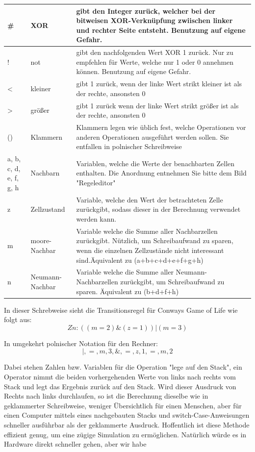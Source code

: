 \documentclass[11pt,a4paper]{article}
\begin{document}
\begin{longtable}[m]{|m{2cm}|m{2.5cm}|m{6.5cm}|}
\hline
\#&XOR&gibt den Integer zurück, welcher bei der bitweisen XOR-Verknüpfung zwiischen linker und rechter Seite entsteht. Benutzung auf eigene Gefahr.\\
\hline
! & not & gibt den nachfolgenden Wert XOR 1 zurück. Nur zu empfehlen für Werte, welche nur 1 oder 0 annehmen können. Benutzung auf eigene Gefahr.\\
\hline
< & kleiner & gibt 1 zurück, wenn der linke Wert strikt kleiner ist als der rechte, ansonsten 0\\
\hline
>&größer & gibt 1 zurück wenn der linke Wert strikt größer ist als der rechte, ansonsten 0\\
\hline
()&Klammern&Klammern legen wie üblich fest, welche Operationen vor anderen Operationen ausgeführt werden sollen. Sie entfallen in polnischer Schreibweise\\
\hline
a, b, c, d, e, f, g, h&Nachbarn&Variablen, welche die Werte der benachbarten Zellen enthalten. Die Anordnung entnehmen Sie bitte dem Bild "Regeleditor"\\
\hline 
z&Zellzustand& Variable, welche den Wert der betrachteten Zelle zurückgibt, sodass dieser in der Berechnung verwendet werden kann.\\
\hline
m&moore-Nachbar&Variable welche die Summe aller Nachbarzellen zurückgibt. Nützlich, um Schreibaufwand zu sparen, wenn die einzelnen Zellzustände nicht interessant sind.Äquivalent zu (a+b+c+d+e+f+g+h)\\
\hline
n&Neumann-Nachbar&Variable welche die Summe aller Neumann-Nachbarzellen zurückgibt, um Schreibaufwand zu sparen.  Äquivalent zu (b+d+f+h)\\
\hline
\end{longtable}
\par
In dieser Schrebweise sieht die Transitionsregel für Conways Game of Life wie folgt aus:
\[Zn : ((m=2)\&(z=1))|(m=3) \]
\par
In umgekehrt polnischer Notation für den Rechner:
\[|,=,m,3,\&,=,z,1,=,m,2\]
\par
Dabei stehen Zahlen bzw. Variablen für die Operation "lege auf den Stack", ein Operator nimmt die beiden vorhergehenden Werte von links nach rechts vom Stack und legt das Ergebnis zurück auf den Stack.
Wird dieser Ausdruck von Rechts nach links durchlaufen, so ist die Berechnung dieselbe wie in geklammerter Schreibweise, weniger Übersichtlich für einen Menschen, aber für einen Computer mittels eines nachgebauten Stacks und switch-Case-Anweisungen schneller ausführbar als der geklammerte Ausdruck. Hoffentlich ist diese Methode effizient genug, um eine zügige Simulation zu ermöglichen. Natürlich würde es in Hardware direkt schneller gehen, aber wir habe
\end{document}
